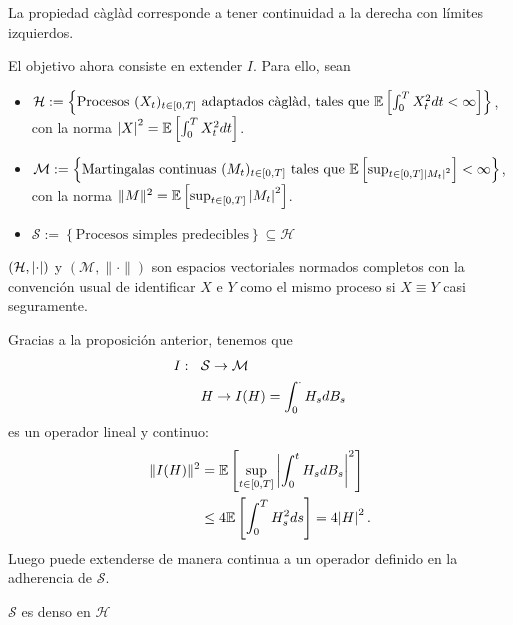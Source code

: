 \begin{notation}
    La propiedad càglàd corresponde a tener continuidad a la derecha con límites izquierdos.
\end{notation}
\newp El objetivo ahora consiste en extender $I$. Para ello, sean 
\begin{itemize}
    \item $\mathcal{H} := \left\{ \text{Procesos } (X_t)_{t \in [0,T]} \text{ adaptados càglàd, tales que } \mathbb{E} \left[ \int_{0}^{T} X^2_t dt < \infty \right] \right\}$, 
    \\ con la norma $\abs{X}^2 = \mathbb{E} \left[ \int_{0}^{T} X^2_t dt \right]$.
    \item $\mathcal{M}  := \left\{ \text{Martingalas continuas } (M_t)_{t \in [0,T]} \text{ tales que } \mathbb{E}\left[ \sup_{t \in [0,T] \abs{M_t}^2} \right] < \infty \right\}$, 
    \\ con la norma $ \|M\|^2 = \mathbb{E} \left[\sup_{t \in [0,T]} \abs{M_t}^2 \right]$.
    \item $\mathcal{S} := \left\{\text{Procesos simples predecibles} \right\} \subseteq \mathcal{H}$
\end{itemize}

\begin{remark}
    $(\mathcal{H},\abs{\cdot})$ y $(\mathcal{M}, \|\cdot\|)$ son espacios vectoriales normados completos con la convención usual de identificar $X$ e $Y$ como el mismo proceso si $X \equiv Y$ casi seguramente.
\end{remark}

Gracias a la proposición anterior, tenemos que 
\begin{align*}
        I: \hspace{.25cm}\, & \mathcal{S} \to \mathcal{M} \\ 
           & H \to I(H) = \int_{0}^{\cdot} H_s dB_s 
\end{align*}
es un operador lineal y continuo: 
\begin{align*}
        \| I (H) \|^{2} &= \mathbb{E} \left[ \sup_{t \in [0,T]} \abs{\int_{0}^t H_s dB_s}^2 \right]\\
        &\le 4 \mathbb{E} \left[ \int_{0}^{T} H_s^2 ds \right] = 4 \abs{H}^2\,.
\end{align*}
Luego puede extenderse de manera continua a un operador definido en la adherencia de $\mathcal{S}$. 

\begin{proposition}
    $\mathcal{S}$ es denso en $\mathcal{H}$
\end{proposition}

